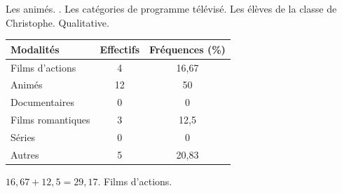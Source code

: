%
%
    \begin{tasks}
        \task Les animés.
        .
        \task Les catégories de programme télévisé.
        \task Les élèves de la classe de Christophe.
        \task Qualitative.
        \task
        \begin{tabular}[t]{lcc}
            \toprule
            Modalités         & Effectifs & Fréquences (\%) \\
            \midrule
            Films d'actions   & 4         & 16,67           \\
            Animés            & 12        & 50              \\
            Documentaires     & 0         & 0               \\
            Films romantiques & 3         & 12,5            \\
            Séries            & 0         & 0               \\
            Autres            & 5         & 20,83           \\
            \bottomrule
        \end{tabular}
        \task $16,67 + 12,5 = 29,17$.
        \task Films d'actions.
        \task %
    \end{tasks}

